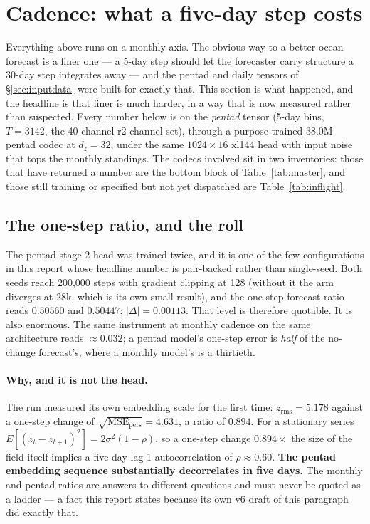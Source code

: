 \documentclass[10pt]{article}
\begin{document}
\section{Cadence: what a five-day step costs}\label{sec:cadence}

Everything above runs on a monthly axis. The obvious way to a better ocean
forecast is a finer one --- a 5-day step should let the forecaster carry
structure a 30-day step integrates away --- and the pentad and daily tensors
of \S\ref{sec:inputdata} were built for exactly that. This section is what
happened, and the headline is that finer is much harder, in a way that is
now measured rather than suspected. Every number below is on the
\emph{pentad} tensor (5-day bins, $T=3142$, the 40-channel r2 channel set),
through a purpose-trained 38.0M pentad codec at $d_z=32$, under the same
$1024\times16$ xl144 head with input noise that tops the monthly standings. The
codecs involved sit in two inventories: those that have returned a number are
the bottom block of Table~\ref{tab:master}, and those still training or
specified but not yet dispatched are Table~\ref{tab:inflight}.

\subsection{The one-step ratio, and the roll}

The pentad stage-2 head was trained twice, and it is one of the few
configurations in this report whose headline number is pair-backed rather
than single-seed. Both seeds reach 200{,}000 steps with gradient clipping at
128 (without it the arm diverges at 28k, which is its own small result), and
the one-step forecast ratio reads $\mathbf{0.50560}$ and
$\mathbf{0.50447}$: $|\Delta| = 0.00113$. That level is therefore quotable.
It is also enormous. The same instrument at monthly cadence on the same
architecture reads $\approx0.032$; a pentad model's one-step error is
\emph{half} of the no-change forecast's, where a monthly model's is a
thirtieth.

\paragraph{Why, and it is not the head.} The run measured its own embedding
scale for the first time: $z_{\mathrm{rms}} = 5.178$ against a one-step
change of $\sqrt{\mathrm{MSE}_{\mathrm{pers}}} = 4.631$, a ratio of
$0.894$. For a stationary series $E[(z_t-z_{t+1})^2] = 2\sigma^2(1-\rho)$, so
a one-step change $0.894\times$ the size of the field itself implies a
five-day lag-1 autocorrelation of $\rho \approx 0.60$. \textbf{The pentad
embedding sequence substantially decorrelates in five days.} The monthly and
pentad ratios are answers to different questions and must never be quoted as
a ladder --- a fact this report states because its own v6 draft of this
paragraph did exactly that.
\end{document}
